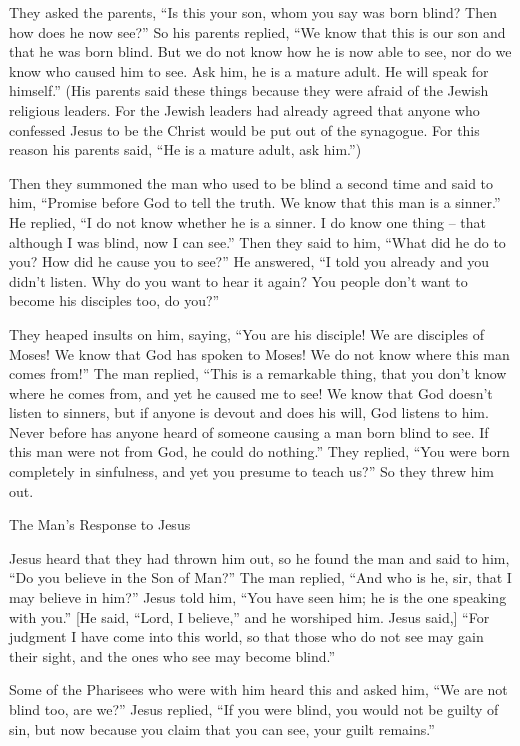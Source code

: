 {They asked
the parents, “Is
this
your
son,
whom
you
say
was born
blind? Then
how
does he
now
see?”
So
his
parents
replied, “We know
that
this
is
our
son
and
that
he was born
blind.
But
we
do
not
know
how
he is
now
able to see,
nor
do we know
who
caused
him
to see.
Ask
him,
he is
a mature adult.
He will speak
for
himself.”
(His parents
said
these things
because
they were afraid
of the Jewish
religious leaders. For
the Jewish leaders had
already
agreed
that anyone
who confessed
Jesus
to be the Christ
would be
put out of the synagogue.
For
this
reason his
parents
said,
“He is
a mature adult,
ask
him.”)
\par }{\PP {}Then
they summoned
the man
who used to be blind
a second time
and
said
to him,
“Promise
before God
to tell the truth. We
know
that
this
man
is a
sinner.”
He replied, “I do
not
know
whether
he is
a sinner.
I do know
one thing
– that
although I was
blind,
now
I can see.”
Then
they said
to him,
“What
did he do
to you? How
did he cause
you
to see?”
He answered, “I told
you
already
and
you
didn’t
listen.
Why
do you want
to hear
it again? You
people don’t
want
to become
his
disciples too, do you?”
\par }{\PP {}They heaped insults
on him,
saying, “You
are
his disciple! We
are
disciples
of Moses!
We
know
that
God
has spoken
to Moses! We
do
not
know
where
this man comes from!”
The man
replied, “This is
a remarkable thing,
that
you
don’t
know
where
he comes from,
and
yet he caused
me
to see!
We know
that
God
doesn’t
listen
to sinners,
but
if
anyone
is
devout
and
does
his
will,
God listens
to him.
Never before
has anyone heard
of someone
causing
a man born
blind
to see.
If
this
man were not
from
God,
he could
do
nothing.”
They replied, “You
were born
completely
in
sinfulness,
and
yet you
presume to teach
us?”
 So
they threw
him
out.
\par }{\SH The Man’s Response to Jesus
\par }{\PP {}Jesus
heard
that
they had thrown
him
out,
so
he found
the man
and said
to him, “Do
you
believe
in
the Son
of Man?”
The man
replied, “And
who
is he,
sir,
that
I
may believe
in
him?”
Jesus
told
him,
“You have seen
him;
he is
the one
speaking
with
you.”
[He said,
“Lord,
I believe,”
and
he worshiped
him.
Jesus
said,]
 “For
judgment
I
have come
into
this
world,
so that
those who do
not
see
may gain
their sight,
and
the ones who see
may become
blind.”
\par }{\PP {}Some of
the Pharisees
who were
with
him
heard
this
and
asked
him, “We are
not
blind
too, are we?”
Jesus
replied, “If
you were
blind,
you would
not
be
guilty of sin,
but
now
because you claim
that
you can see,
your
guilt
remains.”

}
